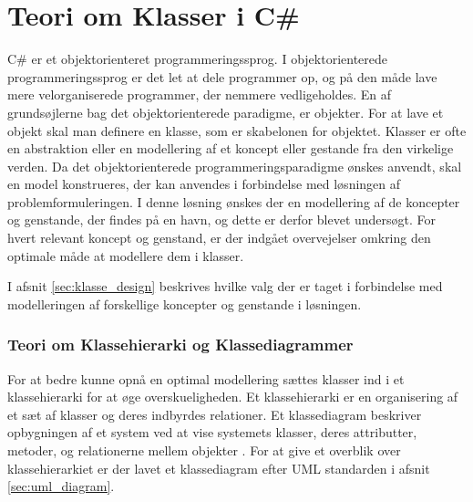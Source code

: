 \section{Teori om Klasser i C\#}
\label{sec:klasse_teori}

C\# er et objektorienteret programmeringssprog. I objektorienterede programmeringssprog er det let at dele programmer op, og på den måde lave mere velorganiserede programmer, der nemmere vedligeholdes. En af grundsøjlerne bag det objektorienterede paradigme, er objekter. For at lave et objekt skal man definere en klasse, som er skabelonen for objektet. Klasser er ofte en abstraktion eller en modellering af et koncept eller gestande fra den virkelige verden. Da det objektorienterede programmeringsparadigme ønskes anvendt, skal en model konstrueres, der kan anvendes i forbindelse med løsningen af problemformuleringen. I denne løsning ønskes der en modellering af de koncepter og genstande, der findes på en havn, og dette er derfor blevet undersøgt. For hvert relevant koncept og genstand, er der indgået overvejelser omkring den optimale måde at modellere dem i klasser.

I afsnit \cref{sec:klasse_design} beskrives hvilke valg der er taget i forbindelse med modelleringen af forskellige koncepter og genstande i løsningen.

\subsubsection{Teori om Klassehierarki og Klassediagrammer}
\label{sub:uml_teori}

For at bedre kunne opnå en optimal modellering sættes klasser ind i et klassehierarki for at øge overskueligheden. Et klassehierarki er en organisering af et sæt af klasser og deres indbyrdes relationer. Et klassediagram beskriver opbygningen af et system ved at vise systemets klasser, deres attributter, metoder, og relationerne mellem objekter \cite{martin2006agile}. For at give et overblik over klassehierarkiet er der lavet et klassediagram efter UML standarden i afsnit \cref{sec:uml_diagram}.
